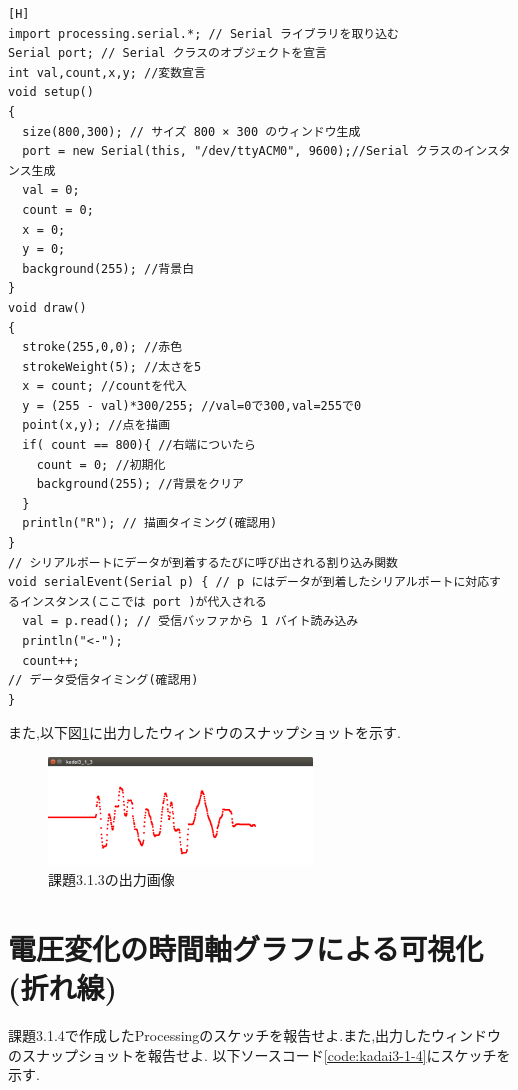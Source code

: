\documentclass{jarticle}
\begin{document}
\begin{lstlisting}[caption = 課題3.1.3,label=code:kadai3-1-3][H]
import processing.serial.*; // Serial ライブラリを取り込む
Serial port; // Serial クラスのオブジェクトを宣言
int val,count,x,y; //変数宣言
void setup()
{
  size(800,300); // サイズ 800 × 300 のウィンドウ生成
  port = new Serial(this, "/dev/ttyACM0", 9600);//Serial クラスのインスタンス生成
  val = 0;
  count = 0;
  x = 0;
  y = 0;
  background(255); //背景白 
}
void draw()
{
  stroke(255,0,0); //赤色
  strokeWeight(5); //太さを5
  x = count; //countを代入
  y = (255 - val)*300/255; //val=0で300,val=255で0
  point(x,y); //点を描画
  if( count == 800){ //右端についたら
    count = 0; //初期化
    background(255); //背景をクリア 
  }
  println("R"); // 描画タイミング(確認用)
}
// シリアルポートにデータが到着するたびに呼び出される割り込み関数
void serialEvent(Serial p) { // p にはデータが到着したシリアルポートに対応するインスタンス(ここでは port )が代入される
  val = p.read(); // 受信バッファから 1 バイト読み込み
  println("<-");
  count++;
// データ受信タイミング(確認用)
}
\end{lstlisting}

また,以下図\ref{fig:kadai3-1-3}に出力したウィンドウのスナップショットを示す.

\begin{figure}[H]
\begin{center}
\includegraphics[width=7.0cm]{images/kadai3-1-3.png}
\caption{課題3.1.3の出力画像}
\label{fig:kadai3-1-3}
\end{center}
\end{figure}


\section{電圧変化の時間軸グラフによる可視化(折れ線)}
課題3.1.4で作成したProcessingのスケッチを報告せよ.また,出力したウィンドウのスナップショットを報告せよ.
以下ソースコード\ref{code:kadai3-1-4}にスケッチを示す.
\end{document}
